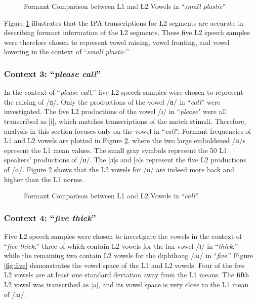 \begin{figure}[h]
  \figSpace
    \centering
    
    \caption{Formant Comparison between L1 and L2 Vowels in “\textit{small plastic}”}
    \label{fig:small}
  \figSpace
\end{figure}

Figure \ref{fig:small} illustrates that the IPA transcriptions for L2 segments are accurate in describing formant information of the L2 segments. These five L2 speech samples were therefore chosen to represent vowel raising, vowel fronting, and vowel lowering in the context of “\textit{small plastic}.” 

\subsubsection{Context 3: “\textit{please call}”}

In the context of “\textit{please call},”  five L2 speech samples were chosen to represent the raising of /ɑ/. Only the productions of the vowel /ɑ/ in “\textit{call}” were investigated. The five L2 productions of the vowel /i/ in ``\textit{please}" were all transcribed as [i], which matches transcriptions of the match stimuli. Therefore, analysis in this section focuses only on the vowel in “\textit{call}”. Formant frequencies of L1 and L2 vowels are plotted in Figure \ref{fig:call}, where the two large emboldened /ɑ/s epresent the L1 mean values. The small gray symbols represent the 50 L1 speakers’ productions of /ɑ/. The [ɔ]s and [o]s represent the five L2 productions of /ɑ/. Figure \ref{fig:call} shows that the L2 vowels for /ɑ/ are indeed more back and higher than the L1 norms. 

\begin{figure}[h]
  \figSpace
    \centering
     
    \caption{Formant Comparison between L1 and L2 Vowels in “\textit{call}”}
    \label{fig:call}
  \figSpace
\end{figure}

\subsubsection{Context 4: “\textit{five thick}”}

Five L2 speech samples were chosen to investigate the vowels in the context of “\textit{five thick},” three of which contain L2 vowels for the lax vowel /ɪ/ in “\textit{thick},” while the remaining two contain L2 vowels for the diphthong /aɪ/ in “\textit{five}.” Figure \ref{fig:five} demonstrates the vowel space of the L1 and L2 vowels. Four of the five L2 vowels are at least one standard deviation away from the L1 means. The fifth L2 vowel was transcribed as [a], and its vowel space is very close to the L1 mean of /aɪ/. 

